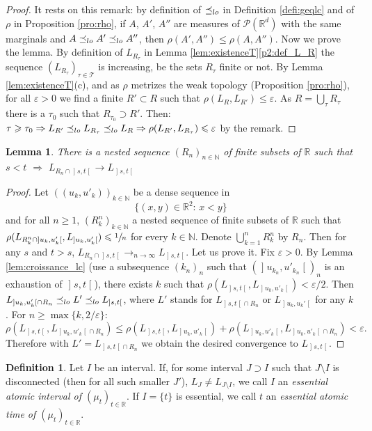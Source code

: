 \documentclass[11pt]{article}
\theoremstyle{plain}
\newtheorem{lem}[them]{Lemma}
\theoremstyle{definition}
\newtheorem{defi}[them]{Definition}
\newcommand{\Tt}{{\mathcal T}}
\let\eps\varepsilon
\newcommand{\p}{\mathcal{P}}
\newcommand{\R}{\mathbb{R}}
\newcommand{\N}{\mathbb{N}}
\newcommand{\op}{\mathopen}
\newcommand{\clo}{\mathclose}
\newcommand{\leqlc}{\preceq_{\rm lo}}
\begin{document}
\begin{proof} It rests on this remark: by definition of $\leqlc$ in Definition \ref{defi:geqlc} and of $\rho$ in Proposition \ref{pro:rho}, if $A$, $A'$, $A''$ are measures of $\p(\R^d)$ with the same marginals and $A\leqlc A'\leqlc A''$, then $\rho(A',A'')\leqslant\rho(A,A'')$. Now we prove the lemma. By definition of $L_{R_\tau}$ in Lemma \ref{lem:existenceT}\eqref{p2:def_L_R} the sequence $(L_{R_\tau})_{\tau\in\Tt}$ is increasing, be the sets $R_\tau$ finite or not. By Lemma \ref{lem:existenceT}(c), and as $\rho$ metrizes the weak topology (Proposition \ref{pro:rho}), for all $\eps>0$ we find a finite $R'\subset R$ such that $\rho(L_R,L_{R'})\leqslant\eps$. As $R=\bigcup_\tau R_\tau$ there is a $\tau_0$ such that $R_{\tau_0}\supset R'$. Then: $\tau\geqslant \tau_0\Rightarrow L_{R'}\leqlc L_{R_\tau}\leqlc L_{R}\Rightarrow \rho(L_{R'},L_{R_\tau})\leqslant\eps$ by the remark.
\end{proof}

\begin{lem}\label{lem:convergence_couples}
There is a nested sequence $(R_n)_{n\in\N}$ of finite subsets of $\R$ such that $s<t$ $\Rightarrow$ $L_{R_n\cap\op]s,t\clo[}\to L_{\op]s,t\clo[}$
\end{lem}
\begin{proof} Let $((u_k,u'_k))_{k\in\N}$ be a dense sequence in
\[
\{(x,y)\in\R^2:\,x< y\}
\]
and for all $n\geq 1$, $(R_k^n)_{k\in\N}$ a nested sequence of finite subsets of $\R$ such that $\rho(L_{R_k^n\cap\op]u_k,u'_k\clo[},L_{\op]u_k,u'_k\clo[})\leqslant\sfrac1n$ for every $k\in \N$. Denote $\bigcup_{k=1}^n R^n_k$ by $R_n$. Then for any $s$ and $t>s$, $L_{R_n\cap\op]s,t\clo[}\to_{n\to\infty}L_{\op]s,t\clo[}$. Let us prove it. Fix $\eps>0$. By Lemma \ref{lem:croissance_lc} (use a subsequence $(k_n)_n$ such that $(\op]u_{k_n},u'_{k_n}\clo[)_n$ is an exhaustion of $\op]s,t\clo[$), there exists $k$ such that $\rho(L_{\op]s,t\clo[},L_{\op]u_k,u'_k\clo[})<\eps/2$. Then $L_{\op]u_k,u_k'\clo[\cap R_n}\leqlc L' \leqlc L_{\op]s,t\clo[}$, where $L'$ stands for $L_{\op]s,t\clo[\cap R_n}$ or $L_{\op]u_k,u_k'\clo[}$ for any $k$. For $n\geq\max\{k,2/\eps\}$:
\[\rho(L_{\op]s,t\clo[},L_{\op]u_k,u'_k\clo[\cap R_n})\leq \rho(L_{\op]s,t\clo[},L_{\op]u_k,u'_k\clo[})+ \rho(L_{\op]u_k,u'_k\clo[},L_{\op]u_k,u'_k\clo[\cap R_n})<\eps.\]
Therefore with $L'=L_{\op]s,t\clo[\cap R_n}$ we obtain the desired convergence to $L_{\op]s,t\clo[}$.
\end{proof}

\begin{defi}\label{defi:essentiel}Let $I$ be an interval. If, for some interval $J\supset I$ such that $J\setminus I$ is disconnected (then for all such smaller $J'$), $L_{J}\neq L_{J\setminus I}$, we call $I$ an \emph{essential atomic interval of $(\mu_t)_{t\in\R}$}. If $I=\{t\}$ is essential, we call $t$ an \emph{essential atomic time of $(\mu_t)_{t\in\R}$}.
\end{defi}
\end{document}
